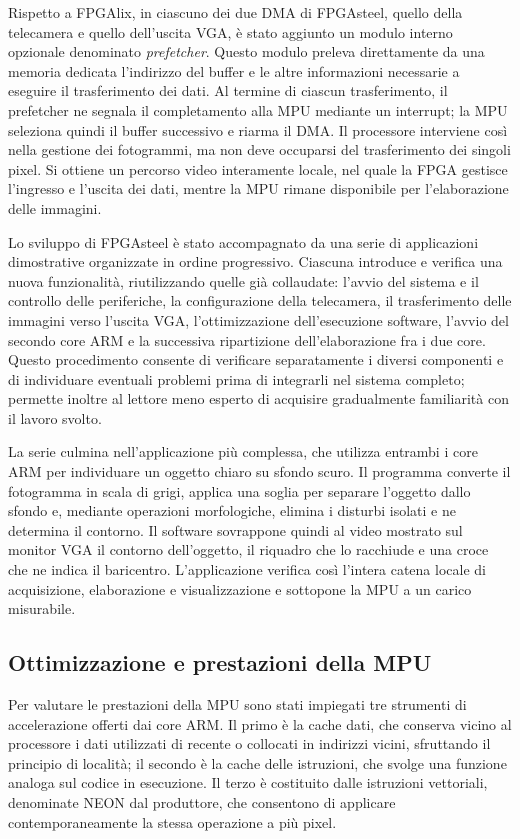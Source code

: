 Rispetto a FPGAlix, in ciascuno dei due DMA di FPGAsteel, quello della telecamera e quello dell'uscita VGA, è stato aggiunto un modulo interno opzionale denominato \emph{prefetcher}. Questo modulo preleva direttamente da una memoria dedicata l'indirizzo del buffer e le altre informazioni necessarie a eseguire il trasferimento dei dati. Al termine di ciascun trasferimento, il prefetcher ne segnala il completamento alla MPU mediante un interrupt; la MPU seleziona quindi il buffer successivo e riarma il DMA. Il processore interviene così nella gestione dei fotogrammi, ma non deve occuparsi del trasferimento dei singoli pixel. Si ottiene un percorso video interamente locale, nel quale la FPGA gestisce l'ingresso e l'uscita dei dati, mentre la MPU rimane disponibile per l'elaborazione delle immagini.

Lo sviluppo di FPGAsteel è stato accompagnato da una serie di applicazioni dimostrative organizzate in ordine progressivo. Ciascuna introduce e verifica una nuova funzionalità, riutilizzando quelle già collaudate: l'avvio del sistema e il controllo delle periferiche, la configurazione della telecamera, il trasferimento delle immagini verso l'uscita VGA, l'ottimizzazione dell'esecuzione software, l'avvio del secondo core ARM e la successiva ripartizione dell'elaborazione fra i due core. Questo procedimento consente di verificare separatamente i diversi componenti e di individuare eventuali problemi prima di integrarli nel sistema completo; permette inoltre al lettore meno esperto di acquisire gradualmente familiarità con il lavoro svolto.

La serie culmina nell'applicazione più complessa, che utilizza entrambi i core ARM per individuare un oggetto chiaro su sfondo scuro. Il programma converte il fotogramma in scala di grigi, applica una soglia per separare l'oggetto dallo sfondo e, mediante operazioni morfologiche, elimina i disturbi isolati e ne determina il contorno. Il software sovrappone quindi al video mostrato sul monitor VGA il contorno dell'oggetto, il riquadro che lo racchiude e una croce che ne indica il baricentro. L'applicazione verifica così l'intera catena locale di acquisizione, elaborazione e visualizzazione e sottopone la MPU a un carico misurabile.

\subsection{Ottimizzazione e prestazioni della MPU}

Per valutare le prestazioni della MPU sono stati impiegati tre strumenti di accelerazione offerti dai core ARM. Il primo è la cache dati, che conserva vicino al processore i dati utilizzati di recente o collocati in indirizzi vicini, sfruttando il principio di località; il secondo è la cache delle istruzioni, che svolge una funzione analoga sul codice in esecuzione. Il terzo è costituito dalle istruzioni vettoriali, denominate NEON dal produttore, che consentono di applicare contemporaneamente la stessa operazione a più pixel.


